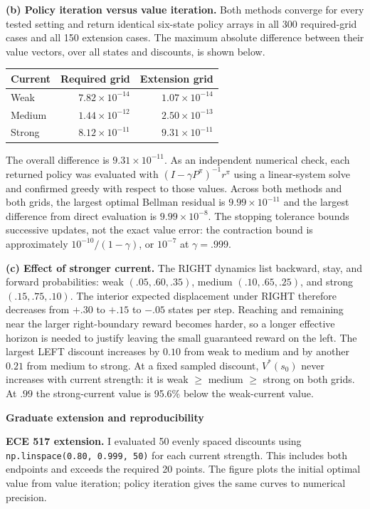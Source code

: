 \documentclass[11pt]{article}
\begin{document}
\textbf{(b) Policy iteration versus value iteration.}
Both methods converge for every tested setting and return identical
six-state policy arrays in all 300 required-grid cases and all 150
extension cases. The maximum absolute difference between their value
vectors, over all states and discounts, is shown below.
\begin{center}
\begin{tabular}{lrr}
\toprule
Current & Required grid & Extension grid\\
\midrule
Weak & $7.82\times 10^{-14}$ & $1.07\times 10^{-14}$ \\
Medium & $1.44\times 10^{-12}$ & $2.50\times 10^{-13}$ \\
Strong & $8.12\times 10^{-11}$ & $9.31\times 10^{-11}$ \\
\bottomrule
\end{tabular}
\end{center}
The overall difference is $9.31\times 10^{-11}$.
As an independent numerical check, each returned policy was evaluated with
$(I-\gamma P^\pi)^{-1}r^\pi$ using a linear-system solve and confirmed greedy
with respect to those values. Across both methods and both grids, the
largest optimal Bellman residual is $9.99\times 10^{-11}$ and the largest difference
from direct evaluation is $9.99\times 10^{-8}$.
The stopping tolerance bounds successive updates, not the exact value
error: the contraction bound is approximately
$10^{-10}/(1-\gamma)$, or $10^{-7}$ at $\gamma=.999$.

\textbf{(c) Effect of stronger current.}
The RIGHT dynamics list backward, stay, and forward probabilities:
weak $(.05,.60,.35)$, medium $(.10,.65,.25)$, and strong $(.15,.75,.10)$.
The interior expected displacement under RIGHT
therefore decreases from $+.30$ to $+.15$ to $-.05$ states per step.
Reaching and remaining near the larger right-boundary reward becomes harder,
so a longer effective horizon is needed to justify leaving the small
guaranteed reward on the left. The largest LEFT discount increases by
$0.10$ from weak to medium and by another $0.21$ from medium to strong.
At a fixed sampled discount, $V^*(s_0)$ never increases with current strength:
it is weak $\geq$ medium $\geq$ strong on both grids. At $.99$ the strong-current
value is 95.6\% below the weak-current value.

\newpage
{\Large\bfseries\color{navy} Graduate extension and reproducibility}\par
\textbf{ECE 517 extension.}
I evaluated 50 evenly spaced discounts using
\texttt{np.linspace(0.80, 0.999, 50)} for each current strength.
This includes both endpoints and exceeds the required 20 points.
The figure plots the initial optimal value from value iteration;
policy iteration gives the same curves to numerical precision.
\end{document}
